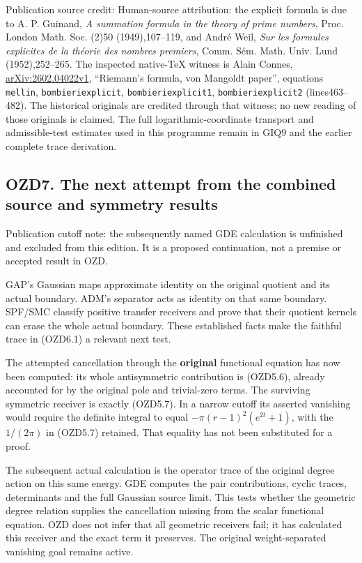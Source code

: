 Publication source credit: Human-source attribution: the explicit
formula is due to A. P. Guinand, \emph{A summation formula in the theory
of prime numbers}, Proc. London Math. Soc. (2)50 (1949),107--119, and
André Weil, \emph{Sur les formules explicites de la théorie des nombres
premiers}, Comm. Sém. Math. Univ. Lund (1952),252--265. The inspected
native-TeX witness is Alain Connes,
\href{https://arxiv.org/abs/2602.04022v1}{arXiv:2602.04022v1},
``Riemann's formula, von Mangoldt paper'', equations \texttt{mellin},
\texttt{bombieriexplicit}, \texttt{bombieriexplicit1},
\texttt{bombieriexplicit2} (lines463--482). The historical originals are
credited through that witness; no new reading of those originals is
claimed. The full logarithmic-coordinate transport and admissible-test
estimates used in this programme remain in GIQ9 and the earlier complete
trace derivation.

\subsection{OZD7. The next attempt from the combined source and symmetry
results}\label{ozd7.-the-next-attempt-from-the-combined-source-and-symmetry-results}

Publication cutoff note: the subsequently named GDE calculation is
unfinished and excluded from this edition. It is a proposed
continuation, not a premise or accepted result in OZD.

GAP's Gaussian maps approximate identity on the original quotient and
its actual boundary. ADM's separator acts as identity on that same
boundary. SPF/SMC classify positive transfer receivers and prove that
their quotient kernels can erase the whole actual boundary. These
established facts make the faithful trace in (OZD6.1) a relevant next
test.

The attempted cancellation through the \textbf{original} functional
equation has now been computed: its whole antisymmetric contribution is
(OZD5.6), already accounted for by the original pole and trivial-zero
terms. The surviving symmetric receiver is exactly (OZD5.7). In a narrow
cutoff its asserted vanishing would require the definite integral to
equal \(-\pi(r-1)^2(e^{2t}+1)\), with the \(1/(2\pi)\) in (OZD5.7)
retained. That equality has not been substituted for a proof.

The subsequent actual calculation is the operator trace of the original
degree action on this same energy. GDE computes the pair contributions,
cyclic traces, determinants and the full Gaussian source limit. This
tests whether the geometric degree relation supplies the cancellation
missing from the scalar functional equation. OZD does not infer that all
geometric receivers fail; it has calculated this receiver and the exact
term it preserves. The original weight-separated vanishing goal remains
active.

